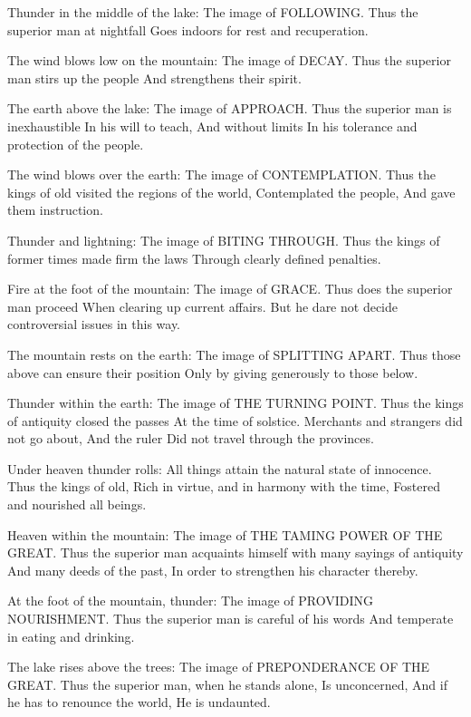 {Thunder in the middle of the lake:
 The image of FOLLOWING.
 Thus the superior man at nightfall
 Goes indoors for rest and recuperation.}

{The wind blows low on the mountain:
 The image of DECAY.
 Thus the superior man stirs up the people
 And strengthens their spirit.}

{The earth above the lake:
 The image of APPROACH.
 Thus the superior man is inexhaustible
 In his will to teach,
 And without limits
 In his tolerance and protection of the people.}

{The wind blows over the earth:
 The image of CONTEMPLATION.
 Thus the kings of old visited the regions of the world,
 Contemplated the people,
 And gave them instruction.}

{Thunder and lightning:
 The image of BITING THROUGH.
 Thus the kings of former times made firm the laws
 Through clearly defined penalties.}

{Fire at the foot of the mountain:
 The image of GRACE.
 Thus does the superior man proceed
 When clearing up current affairs.
 But he dare not decide controversial issues in this way.}

{The mountain rests on the earth:
 The image of SPLITTING APART.
 Thus those above can ensure their position
 Only by giving generously to those below.}

{Thunder within the earth:
 The image of THE TURNING POINT.
 Thus the kings of antiquity closed the passes
 At the time of solstice.
 Merchants and strangers did not go about,
 And the ruler
 Did not travel through the provinces.}

{Under heaven thunder rolls:
 All things attain the natural state of innocence.
 Thus the kings of old,
 Rich in virtue, and in harmony with the time,
 Fostered and nourished all beings.}

{Heaven within the mountain:
 The image of THE TAMING POWER OF
 THE GREAT.
 Thus the superior man acquaints himself with many sayings of antiquity
 And many deeds of the past,
 In order to strengthen his character thereby.}

{At the foot of the mountain, thunder:
 The image of PROVIDING
 NOURISHMENT.
 Thus the superior man is careful of his words
 And temperate in eating and drinking.}

{The lake rises above the trees:
 The image of PREPONDERANCE OF
 THE GREAT.
 Thus the superior man, when he stands alone,
 Is unconcerned,
 And if he has to renounce the world,
 He is undaunted.}

